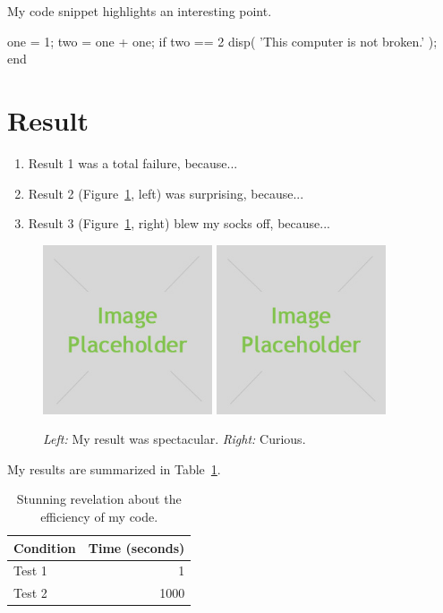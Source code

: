 My code snippet highlights an interesting point.
\begin{python}
one = 1;
two = one + one;
if two == 2
    disp( 'This computer is not broken.' );
end
\end{python}

\section*{Result}

\begin{enumerate}
    \item Result 1 was a total failure, because...
    \item Result 2 (Figure~\ref{fig:result1}, left) was surprising, because...
    \item Result 3 (Figure~\ref{fig:result1}, right) blew my socks off, because...
\end{enumerate}

\begin{figure}[h]
    \centering
    \includegraphics[width=5cm]{placeholder.jpg}
    \includegraphics[width=5cm]{placeholder.jpg}
    \caption{\emph{Left:} My result was spectacular. \emph{Right:} Curious.}
    \label{fig:result1}
\end{figure}

My results are summarized in Table~\ref{tab:table1}.

\begin{table}[h]
    \centering
    \begin{tabular}{lr}
        \toprule
        Condition & Time (seconds) \\
        \midrule
        Test 1 & 1 \\
        Test 2 & 1000 \\
        \bottomrule
    \end{tabular}
    \caption{Stunning revelation about the efficiency of my code.}
    \label{tab:table1}
\end{table}

